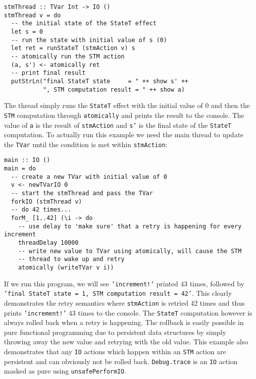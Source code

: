 \begin{footnotesize}
\begin{verbatim}
stmThread :: TVar Int -> IO ()
stmThread v = do
  -- the initial state of the StateT effect
  let s = 0
  -- run the state with initial value of s (0)
  let ret = runStateT (stmAction v) s
  -- atomically run the STM action
  (a, s') <- atomically ret
  -- print final result
  putStrLn("final StateT state     = " ++ show s' ++
           ", STM computation result = " ++ show a)
\end{verbatim}
\end{footnotesize}

\medskip %

The thread simply runs the \texttt{StateT} effect with the initial value of 0 and then the \texttt{STM} computation through \texttt{atomically} and prints the result to the console. The value of \texttt{a} is the result of \texttt{stmAction} and \texttt{s'} is the final state of the \texttt{StateT} computation. To actually run this example we need the main thread to update the \texttt{TVar} until the condition is met within \texttt{stmAction}: \\ %

\begin{footnotesize}
\begin{verbatim}
main :: IO ()
main = do
  -- create a new TVar with initial value of 0
  v <- newTVarIO 0 
  -- start the stmThread and pass the TVar
  forkIO (stmThread v)
  -- do 42 times...
  forM_ [1..42] (\i -> do
    -- use delay to 'make sure' that a retry is happening for every increment
    threadDelay 10000
    -- write new value to TVar using atomically, will cause the STM
    -- thread to wake up and retry
    atomically (writeTVar v i))
\end{verbatim}
\end{footnotesize}

\medskip %

If we run this program, we will see \texttt{'increment!'} printed 43 times, followed by \texttt{'final StateT state = 1, STM computation result = 42'}. This clearly demonstrates the retry semantics where \texttt{stmAction} is retried 42 times and thus prints \texttt{'increment!'} 43 times to the console. The \texttt{StateT} computation however is always rolled back when a retry is happening. The rollback is easily possible in pure functional programming due to persistent data structures by simply throwing away the new value and retrying with the old value. This example also demonstrates that any \texttt{IO} actions which happen within an \texttt{STM} action are persistent and can obviously not be rolled back. \texttt{Debug.trace} is an \texttt{IO} action masked as pure using \texttt{unsafePerformIO}.